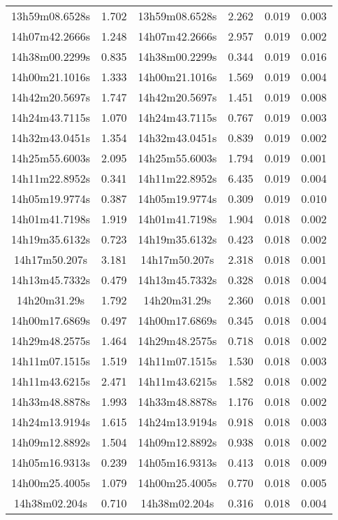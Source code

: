 \begin{table}
\begin{tabular}{cccccc}
13h59m08.6528s & 1.702 & 13h59m08.6528s & 2.262 & 0.019 & 0.003 \\
14h07m42.2666s & 1.248 & 14h07m42.2666s & 2.957 & 0.019 & 0.002 \\
14h38m00.2299s & 0.835 & 14h38m00.2299s & 0.344 & 0.019 & 0.016 \\
14h00m21.1016s & 1.333 & 14h00m21.1016s & 1.569 & 0.019 & 0.004 \\
14h42m20.5697s & 1.747 & 14h42m20.5697s & 1.451 & 0.019 & 0.008 \\
14h24m43.7115s & 1.070 & 14h24m43.7115s & 0.767 & 0.019 & 0.003 \\
14h32m43.0451s & 1.354 & 14h32m43.0451s & 0.839 & 0.019 & 0.002 \\
14h25m55.6003s & 2.095 & 14h25m55.6003s & 1.794 & 0.019 & 0.001 \\
14h11m22.8952s & 0.341 & 14h11m22.8952s & 6.435 & 0.019 & 0.004 \\
14h05m19.9774s & 0.387 & 14h05m19.9774s & 0.309 & 0.019 & 0.010 \\
14h01m41.7198s & 1.919 & 14h01m41.7198s & 1.904 & 0.018 & 0.002 \\
14h19m35.6132s & 0.723 & 14h19m35.6132s & 0.423 & 0.018 & 0.002 \\
14h17m50.207s & 3.181 & 14h17m50.207s & 2.318 & 0.018 & 0.001 \\
14h13m45.7332s & 0.479 & 14h13m45.7332s & 0.328 & 0.018 & 0.004 \\
14h20m31.29s & 1.792 & 14h20m31.29s & 2.360 & 0.018 & 0.001 \\
14h00m17.6869s & 0.497 & 14h00m17.6869s & 0.345 & 0.018 & 0.004 \\
14h29m48.2575s & 1.464 & 14h29m48.2575s & 0.718 & 0.018 & 0.002 \\
14h11m07.1515s & 1.519 & 14h11m07.1515s & 1.530 & 0.018 & 0.003 \\
14h11m43.6215s & 2.471 & 14h11m43.6215s & 1.582 & 0.018 & 0.002 \\
14h33m48.8878s & 1.993 & 14h33m48.8878s & 1.176 & 0.018 & 0.002 \\
14h24m13.9194s & 1.615 & 14h24m13.9194s & 0.918 & 0.018 & 0.003 \\
14h09m12.8892s & 1.504 & 14h09m12.8892s & 0.938 & 0.018 & 0.002 \\
14h05m16.9313s & 0.239 & 14h05m16.9313s & 0.413 & 0.018 & 0.009 \\
14h00m25.4005s & 1.079 & 14h00m25.4005s & 0.770 & 0.018 & 0.005 \\
14h38m02.204s & 0.710 & 14h38m02.204s & 0.316 & 0.018 & 0.004 \\

\end{tabular}
\end{table}
